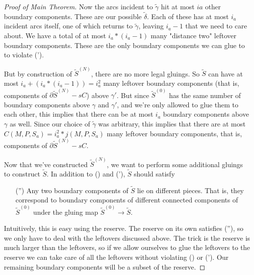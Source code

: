 \documentclass[12pt]{amsart}
\theoremstyle{definition}
\theoremstyle{remark}
\newcommand{\bd}{\partial}
\begin{document}
\begin{proof}[Proof of Main Theorem]
Now the arcs incident to $\widetilde{\gamma}$ hit at most $ia$ other boundary
components. These are our possible $\widetilde{\delta}$. Each of these has at
most $i_a$ incident arcs itself, one of which returns to $\widetilde{\gamma}$,
leaving $i_a-1$ that we need to care about. We have a total of at most
$i_a*(i_a-1)$ many "distance two" leftover boundary components. These are the
only boundary components we can glue to to violate (\dag').

But by construction of $\widetilde{S}^{(N)}$, there are no more legal gluings. So
$\widetilde{S}$ can have at most $i_a+(i_a*(i_a-1)) = i_a^2$ many leftover boundary
components (that is, components of $\bd\widetilde{S}^{(N)}-sC$) above $\gamma'$.  But since
$\widetilde{S}^{(0)}$ has the same number of boundary components above $\gamma$ and
$\gamma'$, and we're only allowed to glue them to each other, this implies that
there can be at most $i_a$ boundary components above $\gamma$ as well.  Since
our choice of $\widetilde{\gamma}$ was arbitrary, this implies that there are
at most $C(M,P,S_a) = i_a^2*j(M,P,S_a)$ many leftover boundary components, that
is, components of $\bd\widetilde{S}^{(N)}-sC$.


Now that we've constructed $\widetilde{S}^{(N)}$, we want to perform some additional
gluings to construct $\widetilde{S}$. In addition to (\dag) and (\dag'), $\widetilde{S}$ should
satisfy

\begin{enumerate}

\item[(\dag'')] Any two boundary components of $\widetilde{S}$ lie on different
pieces. That is, they correspond to boundary components of different connected
components of $\widetilde{S}^{(0)}$ under the gluing map $\widetilde{S}^{(0)}
\to \widetilde{S}$.

\end{enumerate}

Intuitively, this is easy using the reserve. The reserve on its own satisfies
(\dag''), so we only have to deal with the leftovers discussed above.  The trick
is the reserve is much larger than the leftovers, so if we allow ourselves to
glue the leftovers to the reserve we can take care of all the leftovers without
violating (\dag) or (\dag'). Our remaining boundary components will be a subset
of the reserve.


\end{proof}
\end{document}

